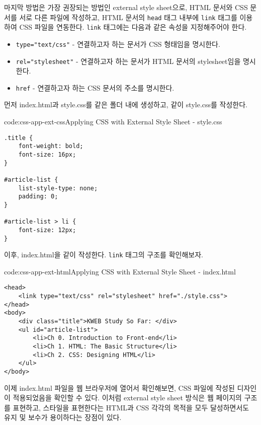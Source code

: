 마지막 방법은 가장 권장되는 방법인 external style sheet으로, HTML 문서와 CSS 문서를 서로 다른 파일에 작성하고, HTML 문서의 \texttt{head} 태그 내부에 \texttt{link} 태그를 이용하여 CSS 파일을 연동한다. \texttt{link} 태그에는 다음과 같은 속성을 지정해주어야 한다.

\begin{itemize}
    \item \texttt{type="text/css"} - 연결하고자 하는 문서가 CSS 형태임을 명시한다.
    \item \texttt{rel="stylesheet"} - 연결하고자 하는 문서가 HTML 문서의 stylesheet임을 명시한다.
    \item \texttt{href} - 연결하고자 하는 CSS 문서의 주소를 명시한다.
\end{itemize}

먼저 index.html과 style.css를 같은 폴더 내에 생성하고, \와 같이 style.css를 작성한다.

\begin{codeenv}{code:css-app-ext-css}{Applying CSS with External Style Sheet - style.css}\begin{verbatim}
.title {
    font-weight: bold;
    font-size: 16px;
}

#article-list {
    list-style-type: none;
    padding: 0;
}

#article-list > li {
    font-size: 12px;
}
\end{verbatim}
\end{codeenv}

이후, index.html을 \과 같이 작성한다. \texttt{link} 태그의 구조를 확인해보자.

\begin{codeenv}{code:css-app-ext-html}{Applying CSS with External Style Sheet - index.html}\begin{verbatim}
<head>
    <link type="text/css" rel="stylesheet" href="./style.css">
</head>
<body>
    <div class="title">KWEB Study So Far: </div>
    <ul id="article-list">
        <li>Ch 0. Introduction to Front-end</li>
        <li>Ch 1. HTML: The Basic Structure</li>
        <li>Ch 2. CSS: Designing HTML</li>
    </ul>
</body>
\end{verbatim}
\end{codeenv}

이제 index.html 파일을 웹 브라우저에 열어서 확인해보면, CSS 파일에 작성된 디자인이 적용되었음을 확인할 수 있다. 이처럼 external style sheet 방식은 웹 페이지의 구조를 표현하고, 스타일을 표현한다는 HTML과 CSS 각각의 목적을 모두 달성하면서도 유지 및 보수가 용이하다는 장점이 있다. 
